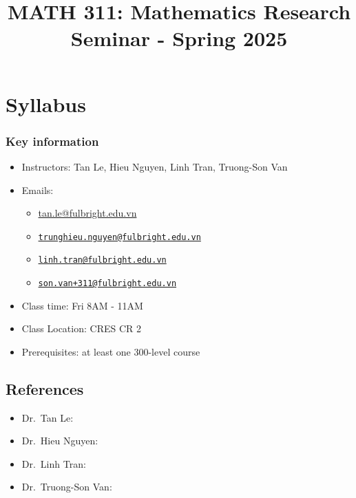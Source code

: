\documentclass[
  openany]{book}
\title{MATH 311: Mathematics Research Seminar - Spring 2025}
\author{}
\date{\vspace{-2.5em}}
\providecommand{\tightlist}{%
  \setlength{\itemsep}{0pt}\setlength{\parskip}{0pt}}
\begin{document}
\maketitle

\chapter*{Syllabus}\label{syllabus}

\subsection*{Key information}\label{key-information}

\begin{itemize}
\tightlist
\item
  Instructors: Tan Le, Hieu Nguyen, Linh Tran, Truong-Son Van
\item
  Emails:

  \begin{itemize}
  \tightlist
  \item
    \href{mailto:tan.le@fulgright.edu.vn}{tan.le@fulbright.edu.vn}
  \item
    \href{mailto:trunghieu.nguyen@fulbright.edu.vn}{\nolinkurl{trunghieu.nguyen@fulbright.edu.vn}}
  \item
    \href{mailto:linh.tran@fulbright.edu.vn}{\nolinkurl{linh.tran@fulbright.edu.vn}}
  \item
    \href{mailto:son.van+311@fulbright.edu.vn}{\nolinkurl{son.van+311@fulbright.edu.vn}}
  \end{itemize}
\item
  Class time: Fri 8AM - 11AM
\item
  Class Location: CRES CR 2
\item
  Prerequisites: at least one 300-level course
\end{itemize}

\section*{References}\label{references}

\begin{itemize}
\item
  Dr.~Tan Le:
\item
  Dr.~Hieu Nguyen:
\item
  Dr.~Linh Tran:
\item
  Dr.~Truong-Son Van:
\end{itemize}
\end{document}
